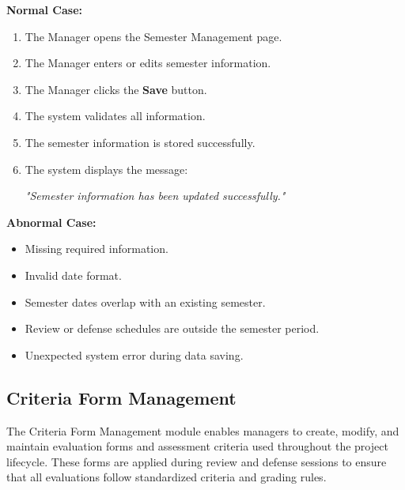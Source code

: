 \vspace{0.2cm}

\textbf{Normal Case:}

\begin{enumerate}
    \item The Manager opens the Semester Management page.
    \item The Manager enters or edits semester information.
    \item The Manager clicks the \textbf{Save} button.
    \item The system validates all information.
    \item The semester information is stored successfully.
    \item The system displays the message:

    \textit{"Semester information has been updated successfully."}
\end{enumerate}

\vspace{0.2cm}

\textbf{Abnormal Case:}

\begin{itemize}
    \item Missing required information.
    \item Invalid date format.
    \item Semester dates overlap with an existing semester.
    \item Review or defense schedules are outside the semester period.
    \item Unexpected system error during data saving.
\end{itemize}


\subsection{Criteria Form Management}

The Criteria Form Management module enables managers to create, modify, and maintain evaluation forms and assessment criteria used throughout the project lifecycle. These forms are applied during review and defense sessions to ensure that all evaluations follow standardized criteria and grading rules.

